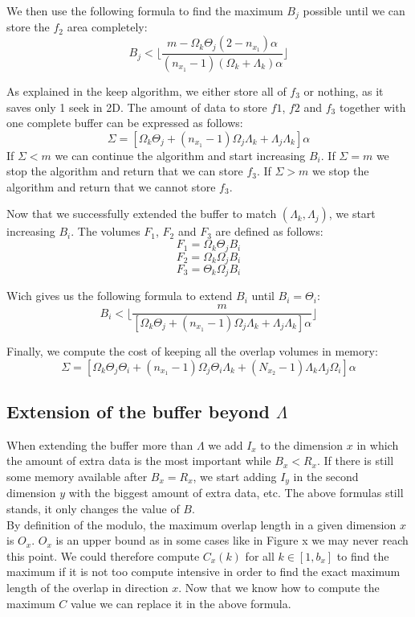 \documentclass[conference]{IEEEtran}
\begin{document}
We then use the following formula to find the maximum $B_j$ possible until we can store the $f_2$ area completely:
$$B_j < \lfloor \frac{m - \Omega_k\Theta_j(2-n_{x_1})\alpha}{(n_{x_1}-1)(\Omega_k+\Lambda_k)\alpha} \rfloor$$

As explained in the keep algorithm, we either store all of $f_3$ or nothing, as it saves only 1 seek in 2D.
The amount of data to store $f1$, $f2$ and $f_3$ together with one complete buffer can be expressed as follows:
$$\Sigma = [\Omega_k\Theta_j + (n_{x_1}-1)\Omega_j\Lambda_k + \Lambda_j\Lambda_k]\alpha$$
If $\Sigma < m$ we can continue the algorithm and start increasing $B_i$.
If $\Sigma = m$ we stop the algorithm and return that we can store $f_3$.
If $\Sigma > m$ we stop the algorithm and return that we cannot store $f_3$.

Now that we successfully extended the buffer to match $(\Lambda_k, \Lambda_j)$, we start increasing $B_i$.
The volumes $F_1$, $F_2$ and $F_3$ are defined as follows:
$$F_1 = \Omega_k \Theta_j B_i$$
$$F_2 = \Omega_k \Omega_j B_i$$
$$F_3 = \Theta_k \Omega_j B_i$$

Wich gives us the following formula to extend $B_i$ until $B_i = \Theta_i$:
$$B_i < \lfloor \frac{m}{[\Omega_k\Theta_j + (n_{x_1}-1)\Omega_j\Lambda_k + \Lambda_j\Lambda_k]\alpha} \rfloor$$

Finally, we compute the cost of keeping all the overlap volumes in memory:
$$\Sigma = [\Omega_k\Theta_j\Theta_i + (n_{x_1}-1)\Omega_j\Theta_i\Lambda_k + (N_{x_2}-1)\Lambda_k\Lambda_j\Omega_i]\alpha$$

\subsection{Extension of the buffer beyond $\Lambda$}
When extending the buffer more than $\Lambda$ we add $I_x$ to the dimension $x$ in which the amount of extra data is the most important while $B_x < R_x$.
If there is still some memory available after $B_x=R_x$, we start adding $I_y$ in the second dimension $y$ with the biggest amount of extra data, etc.
The above formulas still stands, it only changes the value of $B$. \\

By definition of the modulo, the maximum overlap length in a given dimension $x$ is $O_x$.
$O_x$ is an upper bound as in some cases like in Figure x we may never reach this point.
We could therefore compute $C_x(k)$ for all $k \in [1, b_x]$ to find the maximum if it is not too compute intensive in order to find the exact maximum length of the overlap in direction $x$. Now that we know how to compute the maximum $C$ value we can replace it in the above formula.
\end{document}
